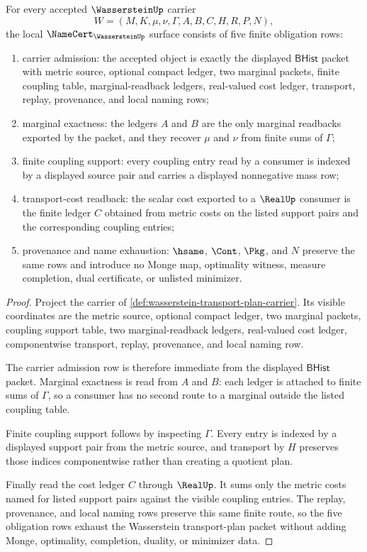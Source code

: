 \begin{theorem}
\label{thm:wasserstein-namecert-obligations}
For every accepted $\WassersteinUp$ carrier
$$
W=(M,K,\mu,\nu,\Gamma,A,B,C,H,R,P,N),
$$
the local $\NameCert_{\WassersteinUp}$ surface consists of five finite obligation rows:
\begin{enumerate}
\item carrier admission: the accepted object is exactly the displayed $\mathsf{BHist}$ packet with metric source, optional compact ledger, two marginal packets, finite coupling table, marginal-readback ledgers, real-valued cost ledger, transport, replay, provenance, and local naming rows;
\item marginal exactness: the ledgers $A$ and $B$ are the only marginal readbacks exported by the packet, and they recover $\mu$ and $\nu$ from finite sums of $\Gamma$;
\item finite coupling support: every coupling entry read by a consumer is indexed by a displayed source pair and carries a displayed nonnegative mass row;
\item transport-cost readback: the scalar cost exported to a $\RealUp$ consumer is the finite ledger $C$ obtained from metric costs on the listed support pairs and the corresponding coupling entries;
\item provenance and name exhaustion: $\hsame$, $\Cont$, $\Pkg$, and $N$ preserve the same rows and introduce no Monge map, optimality witness, measure completion, dual certificate, or unlisted minimizer.
\end{enumerate}
\end{theorem}
\begin{proof}
Project the carrier of \autoref{def:wasserstein-transport-plan-carrier}. Its visible coordinates are the metric source, optional compact ledger, two marginal packets, coupling support table, two marginal-readback ledgers, real-valued cost ledger, componentwise transport, replay, provenance, and local naming row.

The carrier admission row is therefore immediate from the displayed $\mathsf{BHist}$ packet. Marginal exactness is read from $A$ and $B$: each ledger is attached to finite sums of $\Gamma$, so a consumer has no second route to a marginal outside the listed coupling table.

Finite coupling support follows by inspecting $\Gamma$. Every entry is indexed by a displayed support pair from the metric source, and transport by $H$ preserves those indices componentwise rather than creating a quotient plan.

Finally read the cost ledger $C$ through $\RealUp$. It sums only the metric costs named for listed support pairs against the visible coupling entries. The replay, provenance, and local naming rows preserve this same finite route, so the five obligation rows exhaust the Wasserstein transport-plan packet without adding Monge, optimality, completion, duality, or minimizer data.
\end{proof}

